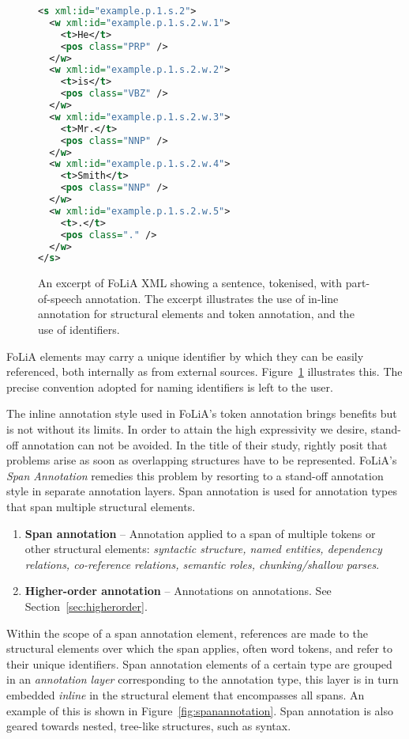 \documentclass[a4paper,10pt,twoside]{article}
\begin{document}
\begin{figure}[tbh]
\label{fig:tokenannotation}
\begin{lstlisting}[language=xml]
<s xml:id="example.p.1.s.2">
  <w xml:id="example.p.1.s.2.w.1">
    <t>He</t>
    <pos class="PRP" />
  </w>
  <w xml:id="example.p.1.s.2.w.2">
    <t>is</t>
    <pos class="VBZ" />
  </w>
  <w xml:id="example.p.1.s.2.w.3">
    <t>Mr.</t>
    <pos class="NNP" />
  </w>
  <w xml:id="example.p.1.s.2.w.4">
    <t>Smith</t>
    <pos class="NNP" />
  </w>
  <w xml:id="example.p.1.s.2.w.5">
    <t>.</t>
    <pos class="." />
  </w>
</s>
\end{lstlisting}
\caption{An excerpt of FoLiA XML showing a sentence, tokenised, with
part-of-speech annotation. The excerpt illustrates the use of in-line annotation for
structural elements and token annotation, and the use of identifiers.}
\end{figure}

FoLiA elements may carry a unique identifier by which they can be easily
referenced, both internally as from external sources. Figure~\ref{fig:tokenannotation} illustrates this. The precise convention adopted for naming identifiers is left to the user.

The inline annotation style used in FoLiA's token annotation brings benefits
but is not without its limits. In order to attain the high expressivity we
desire, stand-off annotation can not be avoided. In the title of their study,
\cite{OHCO2} rightly posit that problems arise as soon as overlapping
structures have to be represented. FoLiA's \emph{Span Annotation} remedies
this problem by resorting to a stand-off annotation style in separate
annotation layers. Span annotation is used for annotation types that span
multiple structural elements.

\begin{enumerate}
\setcounter{enumi}{\theenumTemptwo}
\item \textbf{Span annotation} -- 
Annotation applied to a span of multiple tokens or other structural elements:
\emph{syntactic structure, named entities, dependency relations, co-reference
relations, semantic roles, chunking/shallow parses}.
\item \textbf{Higher-order annotation} -- Annotations on annotations. See Section~\ref{sec:higherorder}.
\end{enumerate}


Within the scope of a span annotation element, references are made to the
structural elements over which the span applies, often word tokens,
and refer to their unique identifiers. Span annotation elements of a certain
type are grouped in an \emph{annotation layer} corresponding to the annotation
type, this layer is in turn embedded \emph{inline} in the structural element
that encompasses all spans. An example of this is shown in
Figure~\ref{fig:spanannotation}. Span annotation is also geared towards nested,
tree-like structures, such as syntax.
\end{document}
